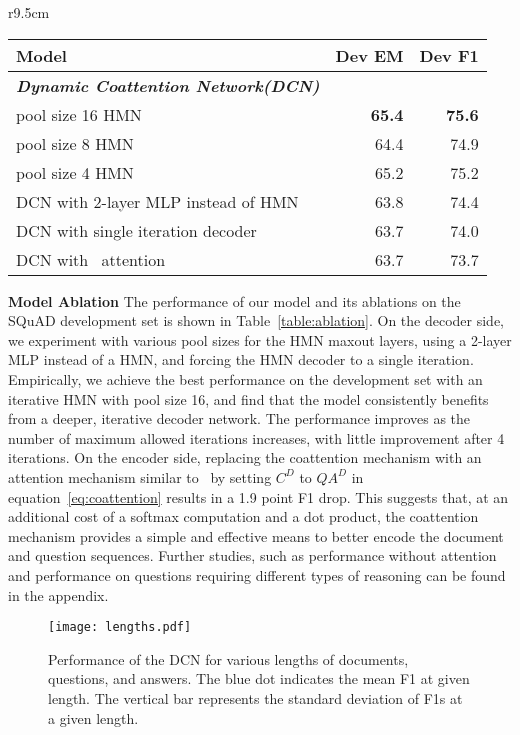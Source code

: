 \documentclass{article} \usepackage{iclr2017_conference,times}
\newcommand{\squad}{SQuAD\xspace}
\newcommand{\ours}{DCN\xspace}
\newcommand{\oursfull}{Dynamic Coattention Network\xspace}
\begin{document}
\begin{wraptable}{r}{9.5cm}
\vspace{-0.75cm}
\centering
\begin{tabular}{lrr}
  \toprule
  Model & Dev EM & Dev F1\\
  \midrule
  \textbf{\textit{\oursfull (\ours)}}\\
  pool size 16 HMN & \textbf{65.4}  & \textbf{75.6}\\
  pool size 8 HMN & 64.4  & 74.9\\
  pool size 4 HMN & 65.2  & 75.2\\
  \midrule
  \ours with 2-layer MLP instead of HMN & 63.8  & 74.4\\
  \ours with single iteration decoder & 63.7  & 74.0\\
  \ours with~\citet{wang2016machine} attention & 63.7  & 73.7\\
  \bottomrule
\end{tabular}
\vspace{-0.3cm}
\caption{
Single model ablations on the development set.
}
\vspace{-0.3cm}
\label{table:ablation}
\end{wraptable}

\textbf{Model Ablation}
The performance of our model and its ablations on the \squad development set is shown in Table~\ref{table:ablation}.
On the decoder side, we experiment with various pool sizes for the HMN maxout layers, using a 2-layer MLP instead of a HMN, and forcing the HMN decoder to a single iteration.
Empirically, we achieve the best performance on the development set with an iterative HMN with pool size 16, and find that the model consistently benefits from a deeper, iterative decoder network.
The performance improves as the number of maximum allowed iterations increases, with little improvement after 4 iterations.
On the encoder side, replacing the coattention mechanism with an attention mechanism similar to~\cite{wang2016machine} by setting $C^D$ to $QA^D$ in equation~\ref{eq:coattention} results in a 1.9 point F1 drop.
This suggests that, at an additional cost of a softmax computation and a dot product, the coattention mechanism provides a simple and effective means to better encode the document and question sequences.
Further studies, such as performance without attention and performance on questions requiring different types of reasoning can be found in the appendix.

\begin{figure}[t]
\centering
\texttt{[image: lengths.pdf]}
\vspace{-0.7cm}
\caption{Performance of the \ours for various lengths of documents, questions, and answers. The blue dot indicates the mean F1 at given length. The vertical bar represents the standard deviation of F1s at a given length.}
\label{fig:perf-lengths}
\vspace{-0.7cm}
\end{figure}
\end{document}
